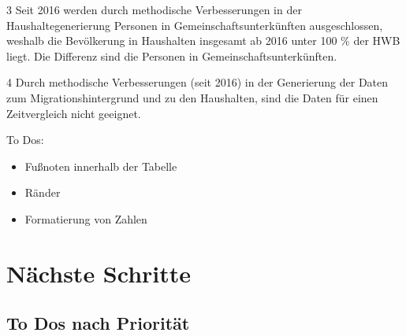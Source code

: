 \documentclass[
  a4paper,
  twoside]{article}
\providecommand{\tightlist}{%
  \setlength{\itemsep}{0pt}\setlength{\parskip}{0pt}}
\begin{document}
\begin{table}[!h]
{\begin{threeparttable}
\begin{tablenotes}
\item[3] Seit 2016 werden durch methodische Verbesserungen in der Haushaltegenerierung Personen in Gemeinschaftsunterkünften ausgeschlossen, weshalb die Bevölkerung in Haushalten insgesamt ab 2016 unter 100 \% der HWB liegt. Die Differenz sind die Personen in Gemeinschaftsunterkünften.
\item[4] Durch methodische Verbesserungen (seit 2016) in der Generierung der Daten zum Migrationshintergrund und zu den Haushalten, sind die Daten für einen Zeitvergleich nicht geeignet.
\end{tablenotes}
\end{threeparttable}}
\end{table}

To Dos:

\begin{itemize}
\tightlist
\item
  Fußnoten innerhalb der Tabelle
\item
  Ränder
\item
  Formatierung von Zahlen
\end{itemize}

\newpage

\hypertarget{nuxe4chste-schritte}{%
\section{Nächste Schritte}\label{nuxe4chste-schritte}}

\hypertarget{to-dos-nach-priorituxe4t}{%
\subsection{To Dos nach Priorität}\label{to-dos-nach-priorituxe4t}}
\end{document}
